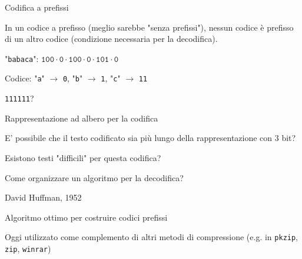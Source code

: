 \begin{frame}{Codifica a prefissi}

\vspace{-9pt}
\begin{myboxtitle}
In un codice a prefisso (meglio sarebbe "senza prefissi"), \alert{nessun codice è
prefisso di un altro codice} (condizione necessaria per la decodifica).
\end{myboxtitle}

\begin{myboxtitle}[Esempio 1]
\BI
\item "\texttt{babaca}": $\texttt{100} \cdot \texttt{0} \cdot \texttt{100} \cdot \texttt{0} \cdot \texttt{101} \cdot \texttt{0}$
\EI
\end{myboxtitle}

\begin{myboxtitle}[Esempio 2]
\BI
\item Codice: "\texttt{a}" $\rightarrow$ \texttt{0}, "\texttt{b}" $\rightarrow$ \texttt{1}, "\texttt{c}" $\rightarrow$ \texttt{11}
\item \texttt{111111}?
\EI
\end{myboxtitle}

\end{frame}


\begin{frame}{Rappresentazione ad albero per la codifica}

\vspace{-9pt}
\begin{myboxtitle}
\BIL
\item E' possibile che il testo codificato sia più lungo della rappresentazione con 3 bit?
\item Esistono testi "difficili" per questa codifica?
\item Come organizzare un algoritmo per la decodifica?
\EIL
\end{myboxtitle}

\begin{myboxtitle}
\BIL
\item David Huffman, 1952
\item Algoritmo ottimo per costruire codici prefissi
\item Oggi utilizzato come complemento di altri metodi di compressione
(e.g. in \texttt{pkzip}, \texttt{zip}, \texttt{winrar})
\EIL
\end{myboxtitle}

\end{frame}


